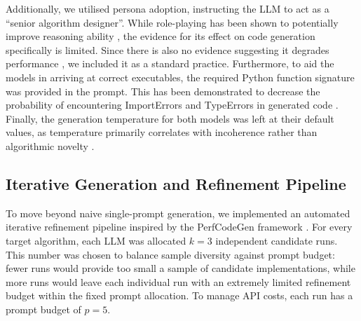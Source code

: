 \documentclass[11pt]{article}
\begin{document}
Additionally, we utilised persona adoption, instructing the LLM to act as 
a ``senior algorithm designer''. While role-playing has been shown to 
potentially improve reasoning ability \cite{roleplay}, the evidence for 
its effect on code generation specifically is limited. Since there is also 
no evidence suggesting it degrades performance \cite{khojah2025}, we 
included it as a standard practice. Furthermore, to aid the models in 
arriving at correct executables, the required Python function signature 
was provided in the prompt. This has been demonstrated to decrease the 
probability of encountering ImportErrors and TypeErrors in generated code 
\cite{khojah2025}. Finally, the generation temperature for both models was 
left at their default values, as temperature primarily correlates with 
incoherence rather than algorithmic novelty \cite{peeperkorn}.

\subsection{Iterative Generation and Refinement Pipeline}
To move beyond naive single-prompt generation, we implemented an automated 
iterative refinement pipeline inspired by the PerfCodeGen framework 
\cite{perfcodegen}. For every target algorithm, each LLM was allocated 
$k = 3$ independent candidate runs. This number was chosen to balance sample diversity against prompt budget: 
fewer runs would provide too small a sample of candidate implementations, 
while more runs would leave each individual run with an extremely limited 
refinement budget within the fixed prompt allocation. To manage API costs, each run has a 
prompt budget of $p = 5$.
\end{document}
